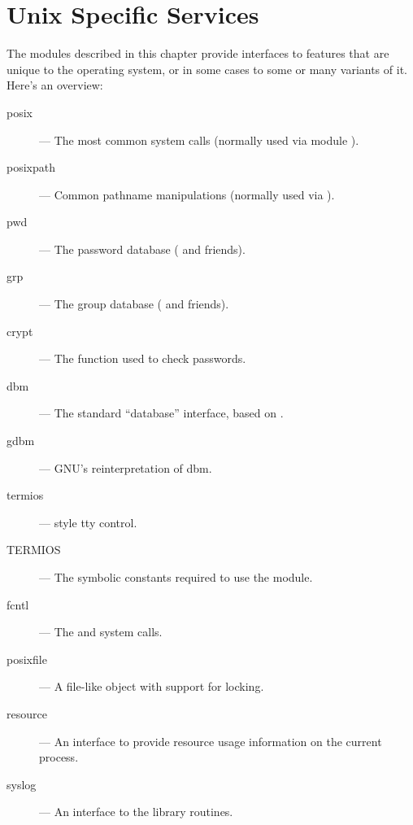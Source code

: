 \chapter{Unix Specific Services}

The modules described in this chapter provide interfaces to features
that are unique to the \UNIX{} operating system, or in some cases to
some or many variants of it.  Here's an overview:

\begin{description}

\item[posix]
--- The most common \POSIX{} system calls (normally used via module ).

\item[posixpath]
--- Common \POSIX{} pathname manipulations (normally used via ).

\item[pwd]
--- The password database ( and friends).

\item[grp]
--- The group database ( and friends).

\item[crypt]
--- The  function used to check \UNIX{} passwords.

\item[dbm]
--- The standard ``database'' interface, based on .

\item[gdbm]
--- GNU's reinterpretation of dbm.

\item[termios]
--- \POSIX{} style tty control.

\item[TERMIOS]
--- The symbolic constants required to use the  module.

\item[fcntl]
--- The  and  system calls.

\item[posixfile]
--- A file-like object with support for locking.

\item[resource]
--- An interface to provide resource usage information on the current
process.

\item[syslog]
--- An interface to the \UNIX{}  library routines.

\end{description}
